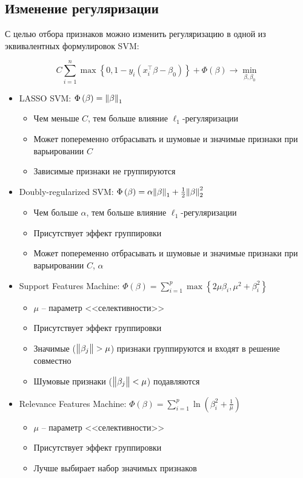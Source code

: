 \documentclass[11pt, a4paper]{article}\usepackage[]{graphicx}\usepackage[]{color}
\begin{document}
\subsection{Изменение регуляризации}
	С целью отбора признаков можно изменить регуляризацию в одной из
	эквивалентных формулировок SVM:

	$$
		C\sum\limits_{i=1}^n\max\left\{0, 1-y_i\left(x_i^\intercal \beta - \beta_0\right)\right\}+\Phi\left(\beta\right)\rightarrow \min\limits_{\beta,\beta_0}
	$$

	\begin{itemize}
		\item LASSO SVM: $\Phi\left(\beta\right)=\norm{\beta}_1$
			\begin{itemize}
				\item Чем меньше $C$, тем больше влияние $\ell_1$-регуляризации
				\item Может попеременно отбрасывать и шумовые и значимые признаки при варьировании $C$
				\item Зависимые признаки не группируются
			\end{itemize}
		\item Doubly-regularized SVM: $\Phi\left(\beta\right)=\alpha\norm{\beta}_1+\frac{1}{2}\norm{\beta}_2^2$
			\begin{itemize}
				\item Чем больше $\alpha$, тем больше влияние $\ell_1$-регуляризации
				\item Присутствует эффект группировки
				\item Может попеременно отбрасывать и шумовые и значимые признаки при варьировании $C$, $\alpha$
			\end{itemize}
		\item Support Features Machine: $\Phi\left(\beta\right)=\sum\limits_{i=1}^{p}\max\left\{2\mu\beta_i, \mu^2+\beta_i^2\right\}$
			\begin{itemize}
				\item $\mu$ -- параметр <<селективности>>
				\item Присутствует эффект группировки
				\item Значимые ($\norm{\beta_j}>\mu$) признаки группируются и входят в решение совместно
				\item Шумовые признаки ($\norm{\beta_j}<\mu$) подавляются
			\end{itemize}
		\item Relevance Features Machine: $\Phi\left(\beta\right)=\sum\limits_{i=1}^{p}\ln\left(\beta_i^2+\frac{1}{\mu}\right)$
			\begin{itemize}
				\item $\mu$ -- параметр <<селективности>>
				\item Присутствует эффект группировки
			    \item Лучше выбирает набор значимых признаков	
			\end{itemize}
	\end{itemize}
\end{document}
